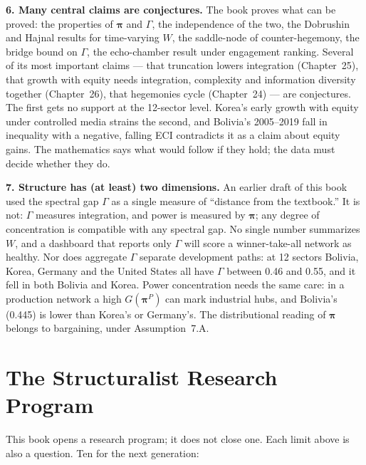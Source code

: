 \documentclass[../structural_economics_book.tex]{subfiles}
\begin{document}
\textbf{6. Many central claims are conjectures.} The book proves what can be proved: the properties of $\boldsymbol{\pi}$ and $\Gamma$, the independence of the two, the Dobrushin and Hajnal results for time-varying $W$, the saddle-node of counter-hegemony, the bridge bound on $\Gamma$, the echo-chamber result under engagement ranking. Several of its most important claims --- that truncation lowers integration (Chapter~25), that growth with equity needs integration, complexity and information diversity together (Chapter~26), that hegemonies cycle (Chapter~24) --- are conjectures. The first gets no support at the 12-sector level. Korea's early growth with equity under controlled media strains the second, and Bolivia's 2005--2019 fall in inequality with a negative, falling ECI contradicts it as a claim about equity gains. The mathematics says what would follow if they hold; the data must decide whether they do.

\textbf{7. Structure has (at least) two dimensions.} An earlier draft of this book used the spectral gap $\Gamma$ as a single measure of ``distance from the textbook.'' It is not: $\Gamma$ measures integration, and power is measured by $\boldsymbol{\pi}$; any degree of concentration is compatible with any spectral gap. No single number summarizes $W$, and a dashboard that reports only $\Gamma$ will score a winner-take-all network as healthy. Nor does aggregate $\Gamma$ separate development paths: at 12 sectors Bolivia, Korea, Germany and the United States all have $\Gamma$ between 0.46 and 0.55, and it fell in both Bolivia and Korea. Power concentration needs the same care: in a production network a high $G(\boldsymbol{\pi}^P)$ can mark industrial hubs, and Bolivia's (0.445) is lower than Korea's or Germany's. The distributional reading of $\boldsymbol{\pi}$ belongs to bargaining, under Assumption~7.A.


\section{The Structuralist Research Program}
\label{ch28:sec:program}

This book opens a research program; it does not close one. Each limit above is also a question. Ten for the next generation:
\end{document}
